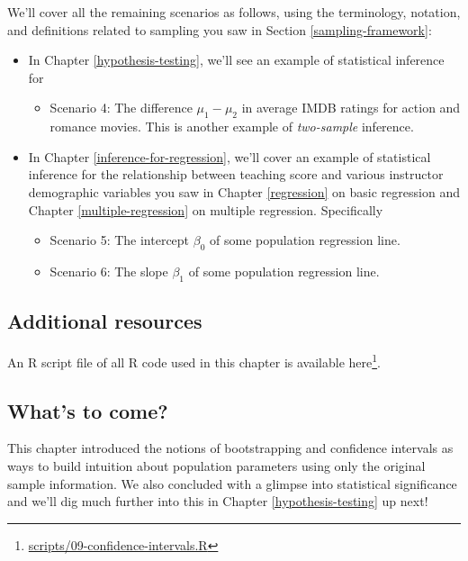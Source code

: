 \documentclass[12pt, krantz2,]{krantz}
\providecommand{\tightlist}{%
  \setlength{\itemsep}{0pt}\setlength{\parskip}{0pt}}
\renewcommand{\href}[2]{#2\footnote{\url{#1}}}
\begin{document}
We'll cover all the remaining scenarios as follows, using the terminology, notation, and definitions related to sampling you saw in Section \ref{sampling-framework}:

\begin{itemize}
\tightlist
\item
  In Chapter \ref{hypothesis-testing}, we'll see an example of statistical inference for

  \begin{itemize}
  \tightlist
  \item
    Scenario 4: The difference \(\mu_1 - \mu_2\) in average IMDB ratings for action and romance movies. This is another example of \emph{two-sample} inference.
  \end{itemize}
\item
  In Chapter \ref{inference-for-regression}, we'll cover an example of statistical inference for the relationship between teaching score and various instructor demographic variables you saw in Chapter \ref{regression} on basic regression and Chapter \ref{multiple-regression} on multiple regression. Specifically

  \begin{itemize}
  \tightlist
  \item
    Scenario 5: The intercept \(\beta_0\) of some population regression line.
  \item
    Scenario 6: The slope \(\beta_1\) of some population regression line.
  \end{itemize}
\end{itemize}

\hypertarget{additional-resources-6}{%
\subsection{Additional resources}\label{additional-resources-6}}

An R script file of all R code used in this chapter is available \href{scripts/09-confidence-intervals.R}{here}.

\hypertarget{whats-to-come-7}{%
\subsection{What's to come?}\label{whats-to-come-7}}

This chapter introduced the notions of bootstrapping and confidence intervals as ways to build intuition about population parameters using only the original sample information. We also concluded with a glimpse into statistical significance and we'll dig much further into this in Chapter \ref{hypothesis-testing} up next!
\end{document}
